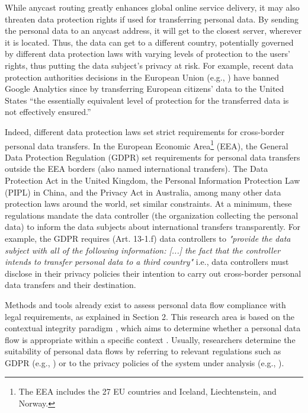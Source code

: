 \documentclass[preprint,12pt]{elsarticle}
\begin{document}
While anycast routing greatly enhances global online service delivery, it may also threaten data protection rights if used for transferring personal data. By sending the personal data to an anycast address, it will get to the closest server, wherever it is located. Thus, the data can get to a different country, potentially governed by different data protection laws with varying levels of protection to the users' rights, thus putting the data subject's privacy at risk. For example, recent data protection authorities decisions in the European Union (e.g., \cite{EuropeanDataProtectionSupervisor2020DecisionEDPS}) have banned Google Analytics since by transferring European citizens’ data to the United States “the essentially equivalent level of protection for the transferred data is not effectively ensured.”

Indeed, different data protection laws set strict requirements for cross-border personal data transfers. In the European Economic Area\footnote{The EEA includes the 27 EU countries and Iceland, Liechtenstein, and Norway.} (EEA), the General Data Protection Regulation (GDPR) \cite{REGULATIONSRelevance} set requirements for personal data transfers outside the EEA borders (also named international transfers). The Data Protection Act \cite{Data2018} in the United Kingdom, the Personal Information Protection Law (PIPL) \cite{MainlandsLaw} in China, and the Privacy Act \cite{Act1988} in Australia, among many other data protection laws around the world, set similar constraints. At a minimum, these regulations mandate the data controller (the organization collecting the personal data) to inform the data subjects about international transfers transparently. For example, the GDPR requires (Art. 13-1.f) data controllers to \textit{"provide the data subject with all of the following information: [...] the fact that the controller intends to transfer personal data to a third country"} i.e., data controllers must disclose in their privacy policies their intention to carry out cross-border personal data transfers and their destination.

Methods and tools already exist to assess personal data flow compliance with legal requirements, as explained in Section 2. This research area is based on the contextual integrity paradigm \cite{Nissenbaum2004PrivacyIntegrity}, which aims to determine whether a personal data flow is appropriate within a specific context \cite{Henriksen-Bulmer2019PrivacyIntegrity}. Usually, researchers determine the suitability of personal data flows by referring to relevant regulations such as GDPR (e.g., \cite{Jia2019WhoCompliance}) or to the privacy policies of the system under analysis (e.g., \cite{Lin2022PrivacyPolicies}).
\end{document}
